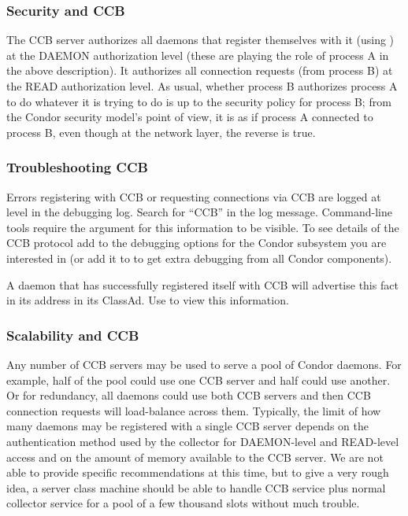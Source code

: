 \subsubsection{Security and CCB}

The CCB server authorizes all daemons that register themselves with it
(using ) at the DAEMON authorization level (these
are playing the role of process A in the above description).  It
authorizes all connection requests (from process B) at the READ
authorization level.  As usual, whether process B authorizes process A
to do whatever it is trying to do is up to the security policy for
process B; from the Condor security model's point of view, it is as if
process A connected to process B, even though at the network layer,
the reverse is true.

\subsubsection{Troubleshooting CCB}

Errors registering with CCB or requesting connections via CCB are
logged at level  in the debugging log.  Search for
``CCB'' in the log message.  Command-line tools require the argument
 for this information to be visible.  To see details of
the CCB protocol add  to the debugging options for
the Condor subsystem you are interested in (or add it to
 to get extra debugging from all Condor
components).

A daemon that has successfully registered itself with CCB will
advertise this fact in its address in its ClassAd.  Use
  to view this information.

\subsubsection{Scalability and CCB}

Any number of CCB servers may be used to serve a pool of Condor
daemons.  For example, half of the pool could use one CCB server and
half could use another.  Or for redundancy, all daemons could use both
CCB servers and then CCB connection requests will load-balance
across them.  Typically, the limit of how many daemons may be
registered with a single CCB server depends on the authentication
method used by the collector for DAEMON-level and READ-level access
and on the amount of memory available to the CCB server.  We are not
able to provide specific recommendations at this time, but to give a
very rough idea, a server class machine should be able to handle CCB
service plus normal collector service for a pool of a few thousand
slots without much trouble.

